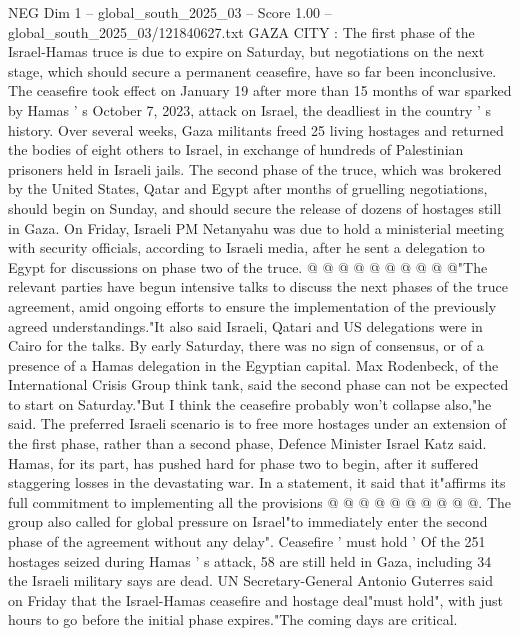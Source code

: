 \begin{textsample}{NEG Dim 1 – global\_south\_2025\_03 – Score 1.00 – global\_south\_2025\_03/121840627.txt}  \label{ex:f1_neg_162}
GAZA CITY : The first phase of the Israel-Hamas truce is due to expire on Saturday, but negotiations on the next stage, which should secure a permanent ceasefire, have so far been inconclusive.
The ceasefire took effect on January 19 after more than 15 months of war sparked by Hamas ' s October 7, 2023, attack on Israel, the deadliest in the country ' s history.
Over several weeks, Gaza militants freed 25 living hostages and returned the bodies of eight others to Israel, in exchange of hundreds of Palestinian prisoners held in Israeli jails.
The second phase of the truce, which was brokered by the United States, Qatar and Egypt after months of gruelling negotiations, should begin on Sunday, and should secure the release of dozens of hostages still in Gaza.
On Friday, Israeli PM Netanyahu was due to hold a ministerial meeting with security officials, according to Israeli media, after he sent a delegation to Egypt for discussions on phase two of the truce. @ @ @ @ @ @ @ @ @ @"The relevant parties have begun intensive talks to discuss the next phases of the truce agreement, amid ongoing efforts to ensure the implementation of the previously agreed understandings."It also said Israeli, Qatari and US delegations were in Cairo for the talks.
By early Saturday, there was no sign of consensus, or of a presence of a Hamas delegation in the Egyptian capital.
Max Rodenbeck, of the International Crisis Group think tank, said the second phase can not be expected to start on Saturday."But I think the ceasefire probably won't collapse also,"he said.
The preferred Israeli scenario is to free more hostages under an extension of the first phase, rather than a second phase, Defence Minister Israel Katz said.
Hamas, for its part, has pushed hard for phase two to begin, after it suffered staggering losses in the devastating war.
In a statement, it said that it"affirms its full commitment to implementing all the provisions @ @ @ @ @ @ @ @ @ @.
The group also called for global pressure on Israel"to immediately enter the second phase of the agreement without any delay".
Ceasefire ' must hold ' Of the 251 hostages seized during Hamas ' s attack, 58 are still held in Gaza, including 34 the Israeli military says are dead.
UN Secretary-General Antonio Guterres said on Friday that the Israel-Hamas ceasefire and hostage deal"must hold", with just hours to go before the initial phase expires."The coming days are critical.

\end{textsample}

